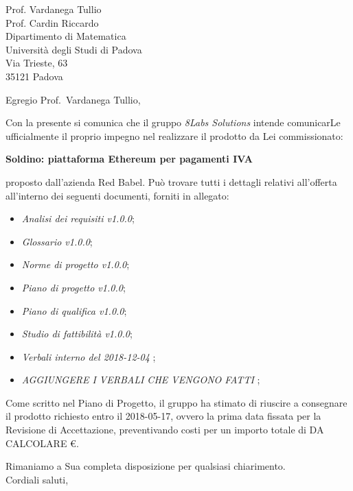 \begin{letter}{
		Prof. Vardanega Tullio \\
		Prof. Cardin Riccardo \\
		Dipartimento di Matematica \\
		Università degli Studi di Padova \\
		Via Trieste, 63 \\
		35121 Padova}
		
\opening{Egregio Prof.~Vardanega Tullio,}
Con la presente si comunica che il gruppo \textit{8Labs Solutions} intende comunicarLe ufficialmente il proprio impegno nel realizzare il prodotto da Lei commissionato:
\begin{center}
	\textbf{Soldino: piattaforma Ethereum per pagamenti IVA}
\end{center}
proposto dall'azienda Red Babel.
Può trovare tutti i dettagli relativi all'offerta all'interno dei seguenti documenti, forniti in allegato:

\begin{itemize}
	\item \textit{Analisi dei requisiti v1.0.0};
	
	\item \textit{Glossario v1.0.0};
	
	\item \textit{Norme di progetto v1.0.0};

	\item \textit{Piano di progetto v1.0.0};

	\item \textit{Piano di qualifica v1.0.0};

	\item \textit{Studio di fattibilità v1.0.0};

	\item \textit{Verbali interno del 2018-12-04}	;
	
	\item \textit{AGGIUNGERE I VERBALI CHE VENGONO FATTI}	;
		
\end{itemize}

Come scritto nel Piano di Progetto, il gruppo ha stimato di riuscire a consegnare il prodotto richiesto entro il 2018-05-17, ovvero la prima data fissata per la Revisione di Accettazione, preventivando costi per un importo totale di DA CALCOLARE \euro.

		
\closing{Rimaniamo a Sua completa disposizione per qualsiasi chiarimento. \\
		Cordiali saluti, }
		
	\end{letter}

